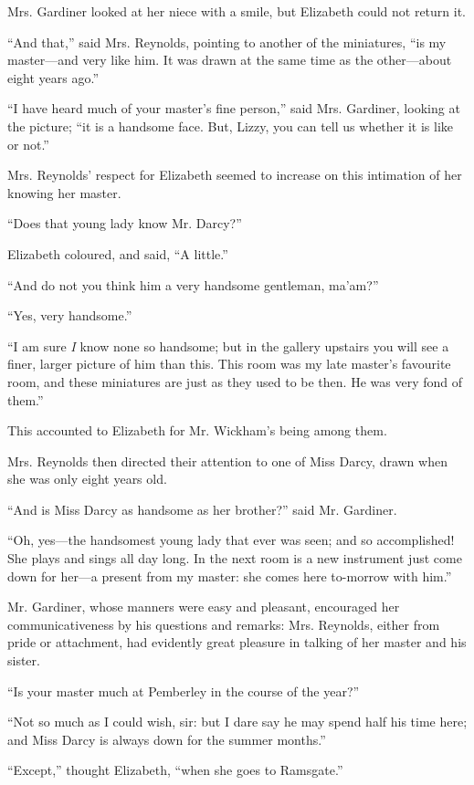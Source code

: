 \documentclass[12pt]{book}
\begin{document}
Mrs. Gardiner looked at her niece with a smile, but Elizabeth could not return it.

``And that,'' said Mrs. Reynolds, pointing to another of the miniatures, ``is my master---and very like him. It was drawn at the same time as the other---about eight years ago.''

``I have heard much of your master's fine person,'' said Mrs. Gardiner, looking at the picture; ``it is a handsome face. But, Lizzy, you can tell us whether it is like or not.''

Mrs. Reynolds' respect for Elizabeth seemed to increase on this intimation of her knowing her master.

``Does that young lady know Mr. Darcy?''

Elizabeth coloured, and said, ``A little.''

``And do not you think him a very handsome gentleman, ma'am?''

``Yes, very handsome.''

``I am sure \textit{I} know none so handsome; but in the gallery upstairs you will see a finer, larger picture of him than this. This room was my late master's favourite room, and these miniatures are just as they used to be then. He was very fond of them.''

This accounted to Elizabeth for Mr. Wickham's being among them.

Mrs. Reynolds then directed their attention to one of Miss Darcy, drawn when she was only eight years old.

``And is Miss Darcy as handsome as her brother?'' said Mr. Gardiner.

``Oh, yes---the handsomest young lady that ever was seen; and so accomplished! She plays and sings all day long. In the next room is a new instrument just come down for her---a present from my master: she comes here to-morrow with him.''

Mr. Gardiner, whose manners were easy and pleasant, encouraged her communicativeness by his questions and remarks: Mrs. Reynolds, either from pride or attachment, had evidently great pleasure in talking of her master and his sister.

``Is your master much at Pemberley in the course of the year?''

``Not so much as I could wish, sir: but I dare say he may spend half his time here; and Miss Darcy is always down for the summer months.''

``Except,'' thought Elizabeth, ``when she goes to Ramsgate.''
\end{document}
